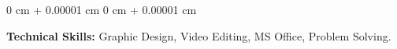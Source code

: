 \documentclass[10pt, letterpaper]{article}
\newenvironment{highlights}{
    \begin{itemize}[
        topsep=0.10 cm,
        parsep=0.10 cm,
        partopsep=0pt,
        itemsep=0pt,
        leftmargin=0 cm + 10pt
    ]
}{
    \end{itemize}
} %
\newenvironment{onecolentry}{
    \begin{adjustwidth}{
        0 cm + 0.00001 cm
    }{
        0 cm + 0.00001 cm
    }
}{
    \end{adjustwidth}
} %
\newenvironment{twocolentry}[2][]{
    \onecolentry
    \def\secondColumn{#2}
    \setcolumnwidth{\fill, 4.5 cm}
    \begin{paracol}{2}
}{
    \switchcolumn \raggedleft \secondColumn
    \end{paracol}
    \endonecolentry
} %
\begin{document}
\begin{onecolentry}
    \textbf{Technical Skills:} Graphic Design, Video Editing, MS Office, Problem Solving.
\end{onecolentry}





      


\end{document}
